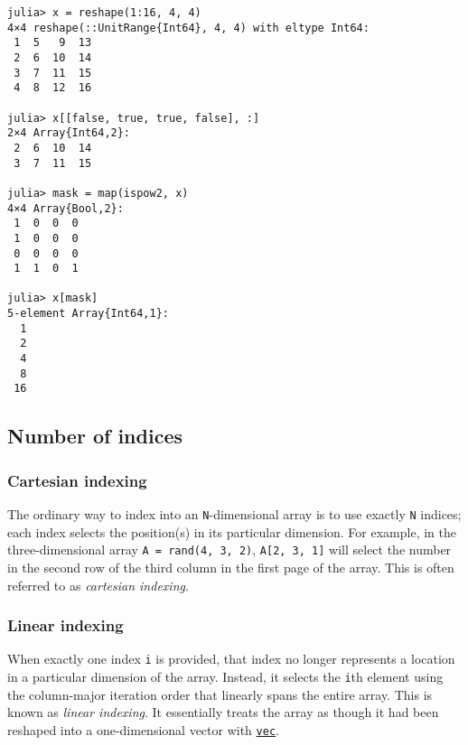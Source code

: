 \begin{verbatim}
julia> x = reshape(1:16, 4, 4)
4×4 reshape(::UnitRange{Int64}, 4, 4) with eltype Int64:
 1  5   9  13
 2  6  10  14
 3  7  11  15
 4  8  12  16

julia> x[[false, true, true, false], :]
2×4 Array{Int64,2}:
 2  6  10  14
 3  7  11  15

julia> mask = map(ispow2, x)
4×4 Array{Bool,2}:
 1  0  0  0
 1  0  0  0
 0  0  0  0
 1  1  0  1

julia> x[mask]
5-element Array{Int64,1}:
  1
  2
  4
  8
 16
\end{verbatim}



\hypertarget{8886266762373473264}{}


\subsection{Number of indices}



\hypertarget{740108784806621199}{}


\subsubsection{Cartesian indexing}



The ordinary way to index into an \texttt{N}-dimensional array is to use exactly \texttt{N} indices; each index selects the position(s) in its particular dimension. For example, in the three-dimensional array \texttt{A = rand(4, 3, 2)}, \texttt{A[2, 3, 1]} will select the number in the second row of the third column in the first {\textquotedbl}page{\textquotedbl} of the array. This is often referred to as \emph{cartesian indexing}.



\hypertarget{18413909182716267462}{}


\subsubsection{Linear indexing}



When exactly one index \texttt{i} is provided, that index no longer represents a location in a particular dimension of the array. Instead, it selects the \texttt{i}th element using the column-major iteration order that linearly spans the entire array. This is known as \emph{linear indexing}. It essentially treats the array as though it had been reshaped into a one-dimensional vector with \hyperlink{18435874855636770528}{\texttt{vec}}.




